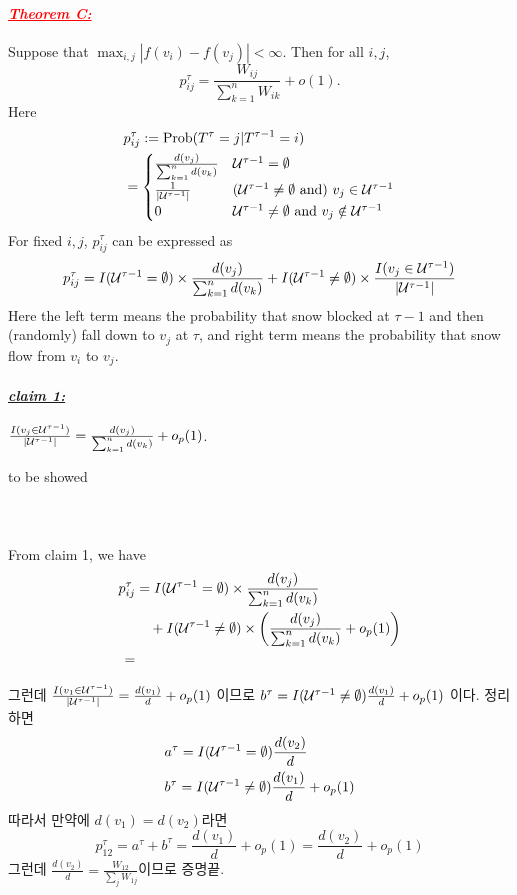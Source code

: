 \documentclass[12pt,oneside,english,a4paper]{article}
\def\bk{\paragraph{\LARGE$$}\LARGE}
\newcommand{\para}[1]{\paragraph{\LARGE\it\underline{\textbf{#1:}}}\LARGE}
\newcommand{\parared}[1]{\paragraph{\LARGE\textcolor{red}{\it\underline{\textbf{#1:}}}}\LARGE}
\begin{document}
\parared{Theorem C} Suppose that $\max_{i,j}|f(v_i)-f(v_j)|<\infty$. Then for all $i,j$, 
\[
p_{ij}^{\tau} = \frac{W_{ij}}{\sum_{k=1}^{n}W_{ik}}+o(1).
\]
Here
\begin{align*}
& p_{ij}^\tau:=\mbox{Prob}(T^{\tau}=j|T^{\tau-1}=i) \\ 
&=
\begin{cases}
\frac{d(v_j)}{\sum_{k=1}^{n}d(v_k)} & {\cal U}^{\tau-1}=\emptyset \\ 
\frac{1}{|{\cal U}^{\tau-1}|} & ({\cal U}^{\tau-1} \neq \emptyset \mbox{ and})~ v_j \in {\cal U}^{\tau-1}\\ 
0 & {\cal U}^{\tau-1} \neq \emptyset \mbox{ and } v_j \notin {\cal U}^{\tau-1}
\end{cases}
\end{align*}
\proof
For fixed $i,j$, $p_{ij}^{\tau}$ can be expressed as 
\begin{align*}
p_{ij}^{\tau}=I({\cal U}^{\tau-1}=\emptyset)\times \frac{d(v_j)}{\sum_{k=1}^{n}d(v_k)}+I({\cal U}^{\tau-1}\neq \emptyset)\times \frac{I(v_j\in{\cal U}^{\tau-1})}{|{\cal U}^{\tau-1}|}
\end{align*}
Here the left term means the probability that snow blocked at $\tau-1$ and then (randomly) fall down to $v_j$ at $\tau$, and right term means the probability that snow flow from $v_i$ to $v_j$. 

\para{claim 1} $\frac{I(v_j\in{\cal U}^{\tau-1})}{|{\cal U}^{\tau-1}|}=\frac{d(v_j)}{\sum_{k=1}^{n}d(v_k)}+o_p(1)$.

\proof to be showed

\bk From claim 1, we have 
\begin{align*}
p_{ij}^{\tau}&=I({\cal U}^{\tau-1}=\emptyset)\times \frac{d(v_j)}{\sum_{k=1}^{n}d(v_k)}\\ 
&\quad+I({\cal U}^{\tau-1}\neq \emptyset)\times \left(\frac{d(v_j)}{\sum_{k=1}^{n}d(v_k)}+o_p(1)\right)\\
=
\end{align*}


그런데 $\frac{I(v_1\in{\cal U}^{\tau-1})}{|{\cal U}^{\tau-1}|}=\frac{d(v_1)}{d}+o_p(1)$ 이므로 $b^{\tau}=I({\cal U}^{\tau-1}\neq \emptyset)\frac{d(v_1)}{d}+o_p(1)$ 이다. 정리하면
\begin{align*}
& a^{\tau} =I({\cal U}^{\tau-1}=\emptyset)\frac{d(v_2)}{d} \\
& b^{\tau} = I({\cal U}^{\tau-1}\neq\emptyset)\frac{d(v_1)}{d}+o_p(1)
\end{align*}
따라서 만약에 $d(v_1)=d(v_2)$라면 
\[
p_{12}^{\tau}=a^{\tau}+b^{\tau}=\frac{d(v_1)}{d}+o_p(1)=\frac{d(v_2)}{d}+o_p(1)
\]
그런데 $\frac{d(v_2)}{d}=\frac{W_{12}}{\sum_jW_{1j}}$이므로 증명끝. 
\end{document}
